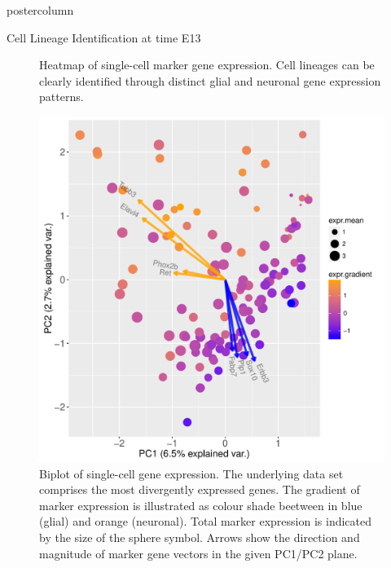 \documentclass{beamer}
\begin{document}
\begin{frame}
\begin{columns}
\begin{column}{.45\textwidth}
\begin{beamercolorbox}[center]{postercolumn}
\begin{minipage}{.98\textwidth}
{\begin{myblock}{Cell Lineage Identification at time E13}
\begin{figure}
\begin{minipage}{1.0\textwidth}
	\caption{Heatmap of single-cell marker gene expression.
			Cell lineages can be clearly identified through distinct
			glial and neuronal gene expression patterns.}
	\label{fig:heatmap}
\end{minipage}
\end{figure}
\begin{figure}
\begin{minipage}{1.0\textwidth}
	\includegraphics[width=1.0\textwidth]{./biplot_semisuperv}
	\caption{Biplot of single-cell gene expression. The underlying data set
		comprises the most divergently expressed genes. The gradient of marker
		expression is illustrated as colour shade beetween in blue (glial) and
		orange (neuronal).
		Total marker expression is indicated by the size of the sphere symbol.
		Arrows show the direction and magnitude of marker gene vectors
		in the given PC1/PC2 plane.}
	\label{fig:biplot}
\end{minipage}
\end{figure}
\end{myblock}\vfill
}\end{minipage}
\end{beamercolorbox}
\end{column}

\end{columns}
\end{frame}
\end{document}

